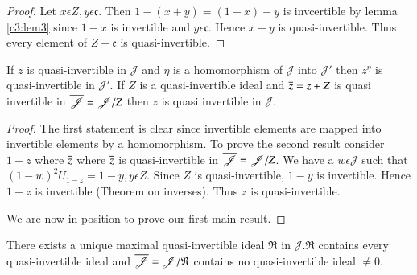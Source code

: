 \begin{proof}
Let $x\epsilon Z, y\epsilon \mathfrak{c}$. Then
$1-(x+y)=(1-x)-y$ is invcertible by lemma \ref{c3:lem3} since $1-x$ is
invertible and $y\epsilon \mathfrak{c}$. Hence $x+y$ is
quasi-invertible. Thus every element of $Z+\mathfrak{c}$ is quasi-invertible.
\end{proof}

\begin{lemma}\label{c3:lem5}
If $z$ is quasi-invertible in $\mathscr{J}$ and $\eta$ is a
homomorphism of $\mathscr{J}$ into $\mathscr{J}'$ then $z^{\eta}$ is
quasi-invertible in $\mathscr{J}'$. If $Z$ is a
quasi-invertible ideal and $\overline{z}=z+Z$ is quasi invertible
in $\overline{\mathscr{J}}=\mathscr{J}/Z$ then $z$ is quasi invertible
in $\mathscr{J}$.
\end{lemma}

\begin{proof}
The first statement is clear since invertible elements are mapped into
invertible elements by a homomorphism. To prove the second result
consider $1-z$ where $\overline{z}$ where $\overline{z}$ is quasi-invertible in
$\overline{\mathscr{J}}=\mathscr{J}/Z$. We have a\pageoriginale
$w\epsilon \mathscr{J}$ such that $(1-w)^{2}U_{1-z}=1-y,y\epsilon
Z$. Since $Z$ is quasi-invertible, $1-y$ is
invertible. Hence $1-z$ is invertible (Theorem on inverses). Thus $z$
is quasi-invertible. 

We are now in position to prove our first main result.
\end{proof}

\setcounter{thm}{0}
\begin{thm}\label{c3:thm1}
There exists a unique maximal quasi-invertible ideal $\mathfrak{R}$ in
$\mathscr{J}.\mathfrak{R}$ contains every quasi-invertible ideal and
$\overline{\mathscr{J}}=\mathscr{J}/\mathfrak{R}$ contains no
quasi-invertible ideal $\neq 0$. 
\end{thm}

